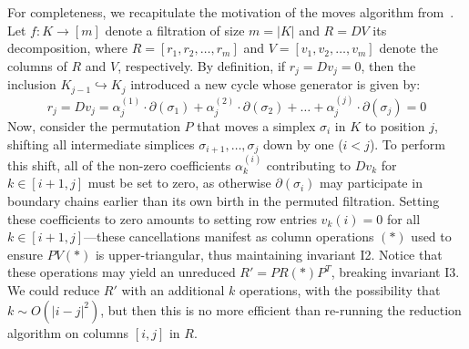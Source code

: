\documentclass[sn-mathphys]{sn-jnl}
\begin{document}
For completeness, we recapitulate the motivation of the moves algorithm from~\cite{busaryev2010tracking}. 
Let $f: K \rightarrow [m]$ denote a filtration of size $m = \lvert K \rvert$ and $R = DV$ its decomposition, where $R = [r_1, r_2, \dots, r_m]$ and $V = [v_1, v_2, \dots, v_m]$ denote the columns of $R$ and $V$, respectively. By definition, if $r_j = D v_j = 0$, then the inclusion $K_{j-1} \hookrightarrow K_{j}$ introduced a new cycle whose generator is given by:
\begin{equation}\label{eq:coefficients}
	r_j = D v_j = \alpha_j^{(1)} \cdot \partial(\sigma_{1}) + \alpha_{j}^{(2)} \cdot \partial(\sigma_{2}) + \dots + \alpha_{j}^{(j)} \cdot \partial(\sigma_{j}) = 0
\end{equation}
Now, consider the permutation $P$ that moves a simplex $\sigma_i$ in $K$ to position $j$, shifting all intermediate simplices $\sigma_{i+1}, \dots, \sigma_{j}$ down by one ($i < j$). 
To perform this shift, all of the non-zero coefficients $\alpha_k^{(i)}$ contributing to $Dv_k$ for $k \in [i+1, j]$ must be set to zero, as otherwise $\partial(\sigma_i)$ may participate in boundary chains earlier than its own birth in the permuted filtration. 
Setting these coefficients to zero amounts to setting row entries $v_k(i) = 0$ for all $k \in [i+1,j]$---these cancellations manifest as column operations $(\ast)$ used to ensure $P V(\ast)$ is upper-triangular, thus maintaining invariant I2.
Notice that these operations may yield an unreduced $R' = P R(\ast) P^T$, breaking invariant I3.
We could reduce $R'$ with an additional $k$ operations, with the possibility that $k \sim O(\lvert i - j\rvert^2)$, but then this is no more efficient than re-running the reduction algorithm on columns $[i,j]$ in $R$. 
\end{document}
